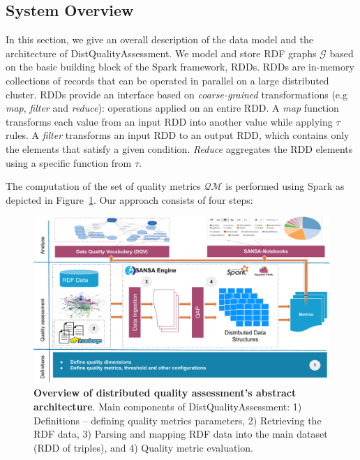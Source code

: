 \subsection{System Overview}
In this section, we give an overall description of the data model and the architecture of DistQualityAssessment.
We model and store \gls{RDF} graphs $\mathcal{G}$ based on the basic building block of the Spark framework, \gls{RDD}s. 
\gls{RDD}s are in-memory collections of records that can be operated in parallel on a large distributed cluster.
\gls{RDD}s provide an interface based on \emph{coarse-grained} transformations (e.g \emph{map}, \emph{filter} and \emph{reduce}): operations applied on an entire \gls{RDD}. 
A \emph{map} function transforms each value from an input \gls{RDD} into another value while applying $\tau$ rules.
A \emph{filter} transforms an input \gls{RDD} to an output \gls{RDD}, which contains only the elements that satisfy a given condition.
\emph{Reduce} aggregates the \gls{RDD} elements using a specific function from $\tau$.

The computation of the set of quality metrics $\mathcal{QM}$ is performed using Spark as depicted in Figure~\ref{fig:DistQualityAssessmentSystem}.
Our approach consists of four steps: 

\begin{figure}
\centering
\includegraphics[width=1.0\columnwidth]{images/5_distqualityassessment/distqualityassessment-architecture.pdf}
\caption{\textbf{Overview of distributed quality assessment's abstract architecture}.
Main components of DistQualityAssessment: 1) Definitions -- defining quality metrics parameters, 2) Retrieving the RDF data, 3) Parsing and mapping RDF data into the main dataset (RDD of triples), and 4) Quality metric evaluation.}
\label{fig:DistQualityAssessmentSystem}
\end{figure}

